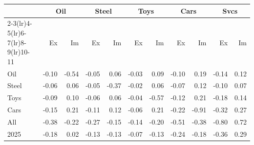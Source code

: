 \begin{tabular}{lrrrrrrrrrr}
\toprule
 & \multicolumn{2}{c}{Oil} & \multicolumn{2}{c}{Steel} & \multicolumn{2}{c}{Toys} & \multicolumn{2}{c}{Cars} & \multicolumn{2}{c}{Svcs} \\
\cmidrule(lr){2-3}\cmidrule(lr){4-5}\cmidrule(lr){6-7}\cmidrule(lr){8-9}\cmidrule(lr){10-11}
 & Ex & Im & Ex & Im & Ex & Im & Ex & Im & Ex & Im \\
\midrule
Oil & -0.10 & -0.54 & -0.05 & 0.06 & -0.03 & 0.09 & -0.10 & 0.19 & -0.14 & 0.12 \\
Steel & -0.06 & 0.06 & -0.05 & -0.37 & -0.02 & 0.06 & -0.07 & 0.12 & -0.10 & 0.07 \\
Toys & -0.09 & 0.10 & -0.06 & 0.06 & -0.04 & -0.57 & -0.12 & 0.21 & -0.18 & 0.14 \\
Cars & -0.15 & 0.21 & -0.11 & 0.12 & -0.06 & 0.21 & -0.22 & -0.91 & -0.32 & 0.27 \\
All & -0.38 & -0.22 & -0.27 & -0.15 & -0.14 & -0.20 & -0.51 & -0.38 & -0.80 & 0.72 \\
2025 & -0.18 & 0.02 & -0.13 & -0.13 & -0.07 & -0.13 & -0.24 & -0.18 & -0.36 & 0.29 \\
\bottomrule
\end{tabular}
